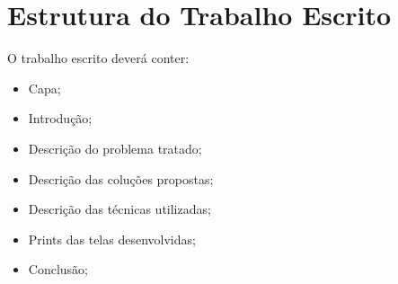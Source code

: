 \chapter{Estrutura do Trabalho Escrito}

O trabalho escrito deverá conter:

\begin{itemize}
    \item Capa;
    \item Introdução;
    \item Descrição do problema tratado;
    \item Descrição das coluções propostas;
    \item Descrição das técnicas utilizadas;
    \item Prints das telas desenvolvidas;
    \item Conclusão;
\end{itemize}